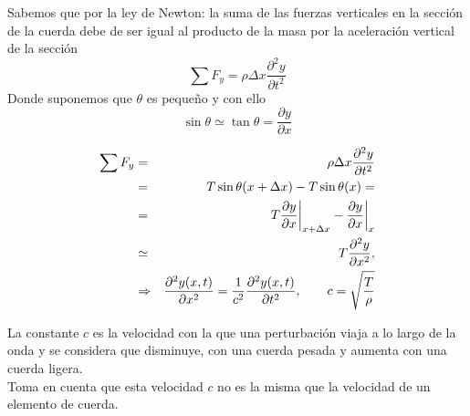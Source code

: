\begin{frame}
Sabemos que por la ley de Newton: la suma de las fuerzas verticales en la sección de la cuerda debe de ser igual al producto de la masa por la aceleración vertical de la sección
\[ \sum F_{y} = \rho \Delta x \dfrac{\partial^{2} y}{\partial t^{2}}\]
Donde suponemos que $\theta$ es pequeño y con ello
\[\sin \theta \simeq \tan \theta = \dfrac{\partial y}{\partial x}\]
\end{frame}
\begin{frame}
\begin{eqnarray*}
\sum F_{y} &=& \rho \Delta x \dfrac{\partial^{2} y}{\partial t^{2}} \\
 &=& T \sin \theta (x + \Delta x)- T \sin \theta (x) = \\
 &=& T \dfrac{\partial y}{\partial x}\bigg\vert_{x+\Delta x} - \dfrac{\partial y}{\partial x} \bigg\vert_{x} \\
 & \simeq & T \dfrac{\partial^{2} y}{\partial x^{2}}, \\
 & \Rightarrow & \dfrac{\partial^{2} y(x,t)}{\partial x^{2}} = \dfrac{1}{c^{2}} \dfrac{\partial^{2} y(x,t)}{\partial t^{2}}, \hspace{0.7cm} c = \sqrt{\dfrac{T}{\rho}}
\end{eqnarray*}
\end{frame}
\begin{frame}
La constante $c$ es la velocidad con la que una perturbación viaja a lo largo de la onda y se considera que disminuye, con una cuerda pesada y aumenta con una cuerda ligera.
\\
\medskip
Toma en cuenta que esta velocidad $c$ no es la misma que la velocidad de un elemento de cuerda.
\end{frame}
